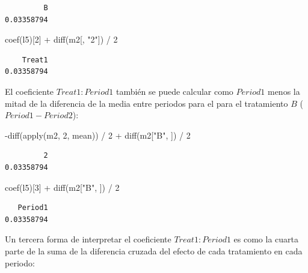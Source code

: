 \documentclass[
  12pt,
  a4paper,
  extrafontsizes,
  onecolumn,
  openright,
  table]{memoir}
\newenvironment{Shaded}{\begin{snugshade}}{\end{snugshade}}
\newcommand{\DecValTok}[1]{\textcolor[rgb]{0.68,0.00,0.00}{#1}}
\newcommand{\FunctionTok}[1]{\textcolor[rgb]{0.28,0.35,0.67}{#1}}
\newcommand{\NormalTok}[1]{\textcolor[rgb]{0.00,0.23,0.31}{#1}}
\newcommand{\SpecialCharTok}[1]{\textcolor[rgb]{0.37,0.37,0.37}{#1}}
\newcommand{\StringTok}[1]{\textcolor[rgb]{0.13,0.47,0.30}{#1}}
\begin{document}
\begin{verbatim}
         B 
0.03358794 
\end{verbatim}

\begin{Shaded}
\begin{Highlighting}[]
\FunctionTok{coef}\NormalTok{(l5)[}\DecValTok{2}\NormalTok{] }\SpecialCharTok{+} \FunctionTok{diff}\NormalTok{(m2[, }\StringTok{"2"}\NormalTok{]) }\SpecialCharTok{/} \DecValTok{2}
\end{Highlighting}
\end{Shaded}

\begin{verbatim}
    Treat1 
0.03358794 
\end{verbatim}

\normalsize

El coeficiente \(Treat1:Period1\) también se puede calcular como
\(Period1\) menos la mitad de la diferencia de la media entre periodos
para el para el tratamiento \(B\) (\(Period1-Period2\)):

\scriptsize

\begin{Shaded}
\begin{Highlighting}[]
\SpecialCharTok{{-}}\FunctionTok{diff}\NormalTok{(}\FunctionTok{apply}\NormalTok{(m2, }\DecValTok{2}\NormalTok{, mean)) }\SpecialCharTok{/} \DecValTok{2} \SpecialCharTok{+} \FunctionTok{diff}\NormalTok{(m2[}\StringTok{"B"}\NormalTok{, ]) }\SpecialCharTok{/} \DecValTok{2}
\end{Highlighting}
\end{Shaded}

\begin{verbatim}
         2 
0.03358794 
\end{verbatim}

\begin{Shaded}
\begin{Highlighting}[]
\FunctionTok{coef}\NormalTok{(l5)[}\DecValTok{3}\NormalTok{] }\SpecialCharTok{+} \FunctionTok{diff}\NormalTok{(m2[}\StringTok{"B"}\NormalTok{, ]) }\SpecialCharTok{/} \DecValTok{2}
\end{Highlighting}
\end{Shaded}

\begin{verbatim}
   Period1 
0.03358794 
\end{verbatim}

\normalsize

Un tercera forma de interpretar el coeficiente \(Treat1:Period1\) es
como la cuarta parte de la suma de la diferencia cruzada del efecto de
cada tratamiento en cada periodo:
\end{document}
